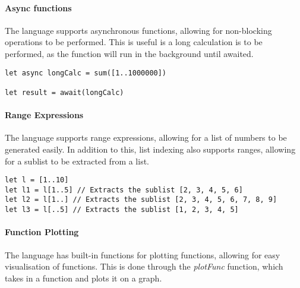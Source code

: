 \paragraph{Async functions} The language supports asynchronous functions, allowing for non-blocking operations
to be performed.
This is useful is a long calculation is to be performed, as the function will run in the background until awaited.

\begin{verbatim}
let async longCalc = sum([1..1000000])

let result = await(longCalc)
\end{verbatim}

\paragraph{Range Expressions} The language supports range expressions, allowing for a list of numbers to be
generated easily.
In addition to this, list indexing also supports ranges, allowing for a sublist to be extracted from a list.

\begin{verbatim}
let l = [1..10]
let l1 = l[1..5] // Extracts the sublist [2, 3, 4, 5, 6]
let l2 = l[1..] // Extracts the sublist [2, 3, 4, 5, 6, 7, 8, 9]
let l3 = l[..5] // Extracts the sublist [1, 2, 3, 4, 5]
\end{verbatim}

\paragraph{Function Plotting} The language has built-in functions for plotting functions, allowing for easy
visualisation of functions.
This is done through the \textit{plotFunc} function, which takes in a function and plots it on a graph.